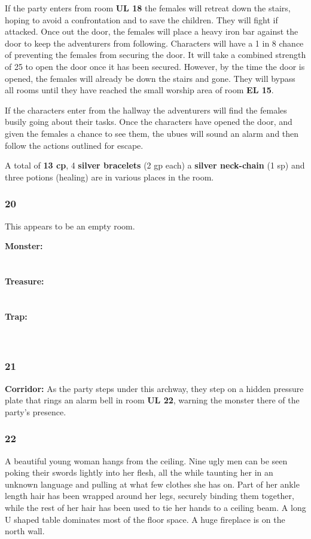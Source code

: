 \documentclass[palace_of_the_silver_princess]{subfiles}
\begin{document}
If the party enters from room \textbf{UL 18} the females will retreat
down the stairs, hoping to avoid a confrontation and to save the
children. They will fight if attacked. Once out the door, the females
will place a heavy iron bar against the door to keep the adventurers
from following.  Characters will have a 1 in 8 chance of preventing the
females from securing the door. It will take a combined strength of 25
to open the door once it has been secured. However, by the time the door
is opened, the females will already be down the stairs and gone. They
will bypass all rooms until they have reached the small worship area of
room \textbf{EL 15}.

If the characters enter from the hallway the adventurers will find the
females busily going about their tasks. Once the characters have
opened the door, and given the females a chance to see them, the ubues
will sound an alarm and then follow the actions outlined for escape.

A total of \textbf{13 cp}, 4 \textbf{silver bracelets} (2 gp each) a
\textbf{silver neck-chain} (1 sp) and three potions (healing) are in
various places in the room.

\subsubsection{20}
\begin{quotebox}
    This appears to be an empty room.
\end{quotebox}

\textbf{Monster:}
\\
\\
\\
\textbf{Treasure:}
\\
\\
\\
\textbf{Trap:}
\\
\\
\\
\subsubsection{21}
\textbf{Corridor:} As the party steps under this archway, they step on a
hidden pressure plate that rings an alarm bell in room \textbf{UL 22},
warning the monster there of the party’s presence.

\subsubsection{22}
\begin{quotebox}
    A beautiful young woman hangs from the ceiling. Nine
    ugly men can be seen poking their swords lightly into her flesh,
    all the while taunting her in an unknown language and pulling at
    what few clothes she has on. Part of her ankle length hair has
    been wrapped around her legs, securely binding them together,
    while the rest of her hair has been used to tie her hands to a
    ceiling beam. A long U shaped table dominates most of the floor
    space. A huge fireplace is on the north wall.
\end{quotebox}
\end{document}
